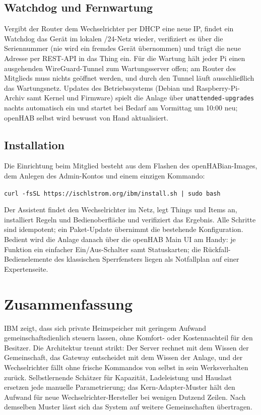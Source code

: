 \documentclass[11pt,a4paper]{article}
\newcommand{\code}[1]{\texttt{#1}}
\begin{document}
\subsection{Watchdog und Fernwartung}

Vergibt der Router dem Wechselrichter per DHCP eine neue IP, findet ein
Watchdog das Gerät im lokalen /24-Netz wieder, verifiziert es über die
Seriennummer (nie wird ein fremdes Gerät übernommen) und trägt die neue
Adresse per REST-API in das Thing ein. Für die Wartung hält jeder Pi einen
ausgehenden WireGuard-Tunnel zum Wartungsserver offen; am Router des
Mitglieds muss nichts geöffnet werden, und durch den Tunnel läuft
ausschließlich das Wartungsnetz. Updates des Betriebssystems (Debian und
Raspberry-Pi-Archiv samt Kernel und Firmware) spielt die Anlage über
\code{unattended-upgrades} nachts automatisch ein und startet bei Bedarf
am Vormittag um 10:00 neu; openHAB selbst wird bewusst von Hand aktualisiert.

\subsection{Installation}

Die Einrichtung beim Mitglied besteht aus dem Flashen des
openHABian-Images, dem Anlegen des Admin-Kontos und einem einzigen
Kommando:
\begin{center}
\code{curl -fsSL https://ischlstrom.org/ibm/install.sh | sudo bash}
\end{center}
Der Assistent findet den Wechselrichter im Netz, legt Things und Items an,
installiert Regeln und Bedienoberfläche und verifiziert das Ergebnis. Alle
Schritte sind idempotent; ein Paket-Update übernimmt die bestehende
Konfiguration. Bedient wird die Anlage danach über die openHAB Main UI am
Handy: je Funktion ein einfacher Ein/Aus-Schalter samt Statuskarten; die
Rückfall-Bedienelemente des klassischen Sperrfensters liegen als
Notfallplan auf einer Expertenseite.

\section{Zusammenfassung}

IBM zeigt, dass sich private Heimspeicher mit geringem Aufwand
gemeinschaftsdienlich steuern lassen, ohne Komfort- oder Kostennachteil für
den Besitzer. Die Architektur trennt strikt: Der Server rechnet mit dem
Wissen der Gemeinschaft, das Gateway entscheidet mit dem Wissen der Anlage,
und der Wechselrichter fällt ohne frische Kommandos von selbst in sein
Werksverhalten zurück. Selbstlernende Schätzer für Kapazität, Ladeleistung
und Hauslast ersetzen jede manuelle Parametrierung; das Kern-Adapter-Muster
hält den Aufwand für neue Wechselrichter-Hersteller bei wenigen Dutzend
Zeilen. Nach demselben Muster lässt sich das System auf weitere
Gemeinschaften übertragen.
\end{document}
